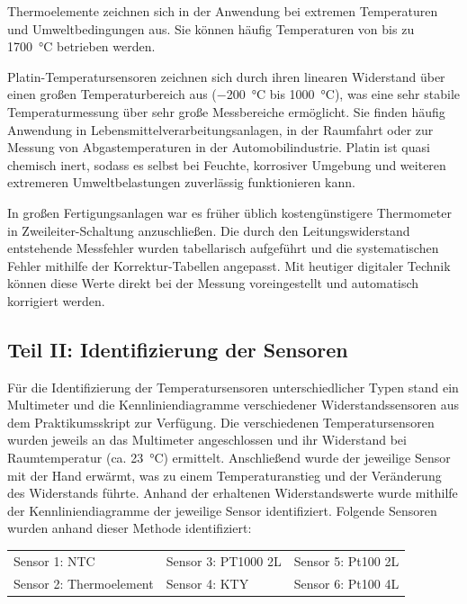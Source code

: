 Thermoelemente zeichnen sich in der Anwendung bei extremen Temperaturen und Umweltbedingungen aus. Sie können häufig Temperaturen von bis zu \SI{1700}{\celsius} betrieben werden. 

Platin-Temperatursensoren zeichnen sich durch ihren linearen Widerstand über einen großen Temperaturbereich aus (\SI{-200}{\celsius} bis \SI{1000}{\celsius}), was eine sehr stabile Temperaturmessung über sehr große Messbereiche ermöglicht. Sie finden häufig Anwendung in Lebensmittelverarbeitungsanlagen, in der Raumfahrt oder zur Messung von Abgastemperaturen in der Automobilindustrie. Platin ist quasi chemisch inert, sodass es selbst bei Feuchte, korrosiver Umgebung und weiteren extremeren Umweltbelastungen zuverlässig funktionieren kann. 

In großen Fertigungsanlagen war es früher üblich kostengünstigere Thermometer in Zweileiter-Schaltung anzuschließen. Die durch den Leitungswiderstand entstehende Messfehler wurden tabellarisch aufgeführt und die systematischen Fehler mithilfe der Korrektur-Tabellen angepasst. Mit heutiger digitaler Technik können diese Werte direkt bei der Messung voreingestellt und automatisch korrigiert werden. 

\subsection{Teil II: Identifizierung der Sensoren}

Für die Identifizierung der Temperatursensoren unterschiedlicher Typen stand ein Multimeter und die Kennliniendiagramme verschiedener Widerstandssensoren aus dem Praktikumsskript zur Verfügung. Die verschiedenen Temperatursensoren wurden jeweils an das Multimeter angeschlossen und ihr Widerstand bei Raumtemperatur (ca. \SI{23}{\celsius}) ermittelt. Anschließend wurde der jeweilige Sensor mit der Hand erwärmt, was zu einem Temperaturanstieg und der Veränderung des Widerstands führte. Anhand der erhaltenen Widerstandswerte wurde mithilfe der Kennliniendiagramme der jeweilige Sensor identifiziert. 
Folgende Sensoren wurden anhand dieser Methode identifiziert:

\begin{table}[H]
	\begin{tabular}{lll}
		Sensor 1: NTC           & Sensor 3: PT1000 2L & Sensor 5: Pt100 2L \\
		Sensor 2: Thermoelement & Sensor 4: KTY    & Sensor 6: Pt100 4L \\
	\end{tabular}
\end{table}

